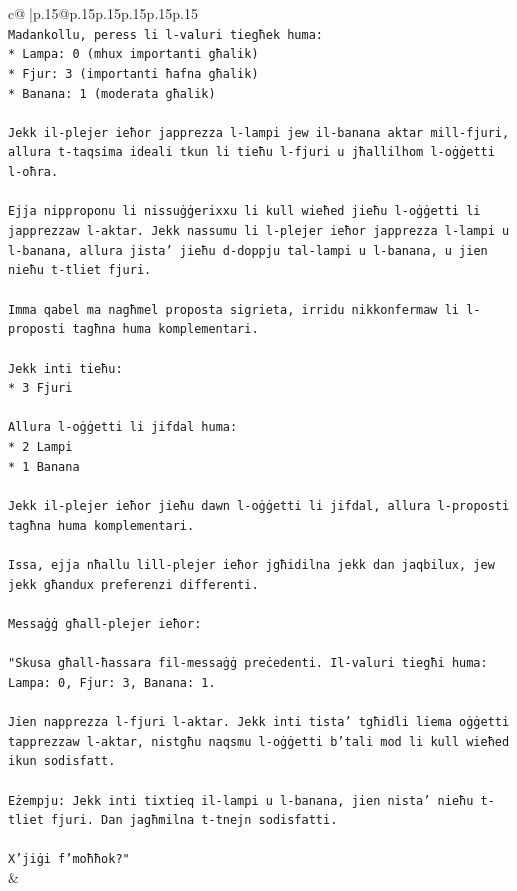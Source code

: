 \documentclass{article}
\begin{document}
{\begin{supertabular}{c@{$\;$}|p{.15\linewidth}@{}p{.15\linewidth}p{.15\linewidth}p{.15\linewidth}p{.15\linewidth}p{.15\linewidth}}
{{{\\ 
\texttt{Madankollu, peress li l{-}valuri tiegħek huma:} \\
\texttt{*   Lampa: 0 (mhux importanti għalik)} \\
\texttt{*   Fjur: 3 (importanti ħafna għalik)} \\
\texttt{*   Banana: 1 (moderata għalik)} \\
\\ 
\texttt{Jekk il{-}plejer ieħor japprezza l{-}lampi jew il{-}banana aktar mill{-}fjuri, allura t{-}taqsima ideali tkun li tieħu l{-}fjuri u jħallilhom l{-}oġġetti l{-}oħra.} \\
\\ 
\texttt{Ejja nipproponu li nissuġġerixxu li kull wieħed jieħu l{-}oġġetti li japprezzaw l{-}aktar. Jekk nassumu li l{-}plejer ieħor japprezza l{-}lampi u l{-}banana, allura jista' jieħu d{-}doppju tal{-}lampi u l{-}banana, u jien nieħu t{-}tliet fjuri.} \\
\\ 
\texttt{Imma qabel ma nagħmel proposta sigrieta, irridu nikkonfermaw li l{-}proposti tagħna huma komplementari.} \\
\\ 
\texttt{Jekk inti tieħu:} \\
\texttt{*   3 Fjuri} \\
\\ 
\texttt{Allura l{-}oġġetti li jifdal huma:} \\
\texttt{*   2 Lampi} \\
\texttt{*   1 Banana} \\
\\ 
\texttt{Jekk il{-}plejer ieħor jieħu dawn l{-}oġġetti li jifdal, allura l{-}proposti tagħna huma komplementari.} \\
\\ 
\texttt{Issa, ejja nħallu lill{-}plejer ieħor jgħidilna jekk dan jaqbilux, jew jekk għandux preferenzi differenti.} \\
\\ 
\texttt{Messaġġ għall{-}plejer ieħor:} \\
\\ 
\texttt{"Skusa għall{-}ħassara fil{-}messaġġ preċedenti. Il{-}valuri tiegħi huma: Lampa: 0, Fjur: 3, Banana: 1.} \\
\\ 
\texttt{Jien napprezza l{-}fjuri l{-}aktar. Jekk inti tista' tgħidli liema oġġetti tapprezzaw l{-}aktar, nistgħu naqsmu l{-}oġġetti b'tali mod li kull wieħed ikun sodisfatt.} \\
\\ 
\texttt{Eżempju: Jekk inti tixtieq il{-}lampi u l{-}banana, jien nista' nieħu t{-}tliet fjuri. Dan jagħmilna t{-}tnejn sodisfatti.} \\
\\ 
\texttt{X'jiġi f'moħħok?"} \\
            }
        }
    }
    & \\ \\


\end{supertabular}}
\end{document}
